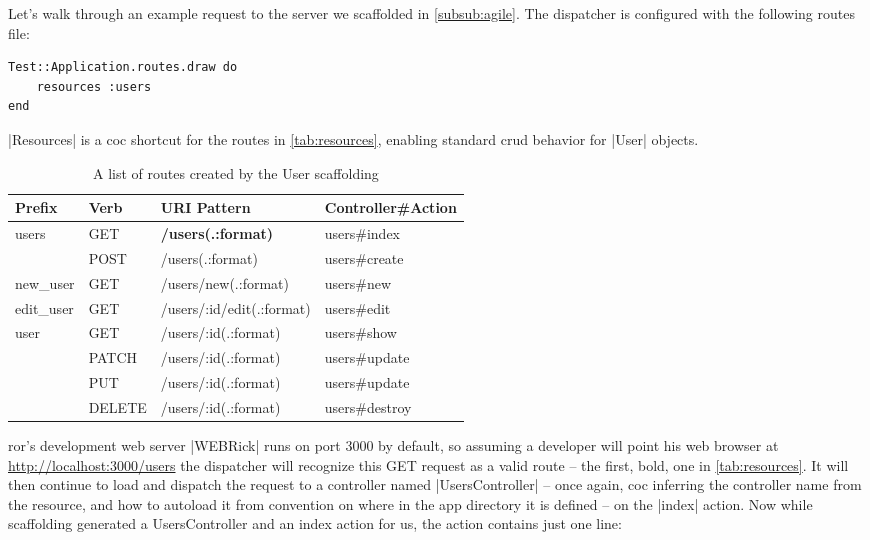 Let's walk through an example request to the server we scaffolded in \autoref{subsub:agile}. The dispatcher is configured with the following routes file:
 
\begin{lstlisting}[escapechar=!]
Test::Application.routes.draw do
    resources :users
end
\end{lstlisting}

|Resources| is a \gls{coc} shortcut for the routes in \autoref{tab:resources}, enabling standard \gls{crud} behavior for |User| objects.

\begin{table}
\centering
\begin{tabular*}{\textwidth}{@{}@{\extracolsep{\fill}}llll@{}}
  \toprule
   Prefix & Verb & URI Pattern & Controller\#Action \\
  \midrule
      users  & GET    & \textbf{/users(.:format)} & users\#index     \\
  \phantom{} & POST   & /users(.:format)          & users\#create    \\
   new\_user  & GET    & /users/new(.:format)      & users\#new     \\
  edit\_user  & GET    & /users/:id/edit(.:format) & users\#edit    \\
       user  & GET    & /users/:id(.:format)      & users\#show    \\
  \phantom{} & PATCH  & /users/:id(.:format)      & users\#update    \\
  \phantom{} & PUT    & /users/:id(.:format)      & users\#update    \\
  \phantom{} & DELETE & /users/:id(.:format)      & users\#destroy  \\
  \bottomrule
\end{tabular*}
\caption{A list of routes created by the User scaffolding}
\label{tab:resources}
\end{table}

\gls{ror}'s development web server |WEBRick| runs on port 3000 by default, so assuming a developer will point his web browser at \url{http://localhost:3000/users} the dispatcher will recognize this GET request as a valid route -- the first, bold, one in \autoref{tab:resources}.
It will then continue to load and dispatch the request to a controller named |UsersController| -- once again, \gls{coc} inferring the controller name from the resource, and how to autoload it from convention on where in the app directory it is defined -- on the |index| action. Now while scaffolding generated a UsersController and an index action for us, the action contains just one line:

